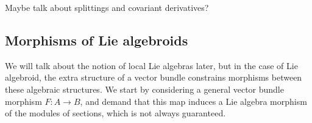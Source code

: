 \label{prop:correspondance_with_poisson_structures}

Maybe talk about splittings and covariant derivatives?

% 

\subsection{Morphisms of Lie algebroids} %
\label{sub:morphisms_of_la}

We will talk about the notion of local Lie algebras later, but in the case of Lie algebroid, the extra structure of a vector bundle constrains morphisms between these algebraic structures.
We start by considering a general vector bundle morphism $F: A \rightarrow B$, and demand that this map induces a Lie algebra morphism of the modules of sections, which is not always guaranteed.
% 
